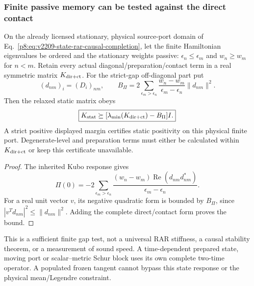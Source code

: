 \documentclass[12pt,a4paper]{article}
\begin{document}
\subsubsection{Finite passive memory can be tested against the direct contact}
\begin{proposition}
\label{p8:prop:v2210-lit-static-memory-margin}
On the already licensed stationary, physical source-port domain of
Eq.~\eqref{p8:eq:v2209-state-rar-causal-completion}, let the finite
Hamiltonian eigenvalues be ordered and the stationary weights passive:
$\epsilon_n\le\epsilon_m$ and $w_n\ge w_m$ for $n<m$.
Retain every actual diagonal/preparation/contact term in a real symmetric
matrix $K_{\rm dir+ct}$. For the strict-gap off-diagonal part put
\[
 (d_{nm})_i=(D_i)_{nm},\qquad
 B_\Pi=2\sum_{\epsilon_m>\epsilon_n}
       \frac{w_n-w_m}{\epsilon_m-\epsilon_n}\|d_{nm}\|^2.
\]
Then the relaxed static matrix obeys
\begin{equation}
\label{p8:eq:v2210-lit-static-memory-bound}
 \boxed{K_{\rm stat}\succeq
       [\lambda_{\min}(K_{\rm dir+ct})-B_\Pi]I.}
\end{equation}
A strict positive displayed margin certifies static positivity on this
physical finite port. Degenerate-level and preparation terms must either
be calculated within $K_{\rm dir+ct}$ or keep this certificate unavailable.
\end{proposition}
\begin{proof}
The inherited Kubo response \cite{Kubo1957} gives
\[
 \Pi(0)=-2\sum_{\epsilon_m>\epsilon_n}
 \frac{(w_n-w_m)\operatorname{Re}(d_{nm}d_{nm}^*)}{\epsilon_m-\epsilon_n}.
\]
For a real unit vector $v$, its negative quadratic form is bounded by
$B_\Pi$, since $|v^Td_{nm}|^2\le\|d_{nm}\|^2$.
Adding the complete direct/contact form proves the bound.
\end{proof}
This is a sufficient finite gap test, not a universal RAR stiffness,
a causal stability theorem, or a measurement of sound speed. A time-dependent
prepared state, moving port or scalar--metric Schur block uses its own
complete two-time operator. A populated frozen tangent cannot bypass this
state response or the physical mean/Legendre constraint.
\end{document}
